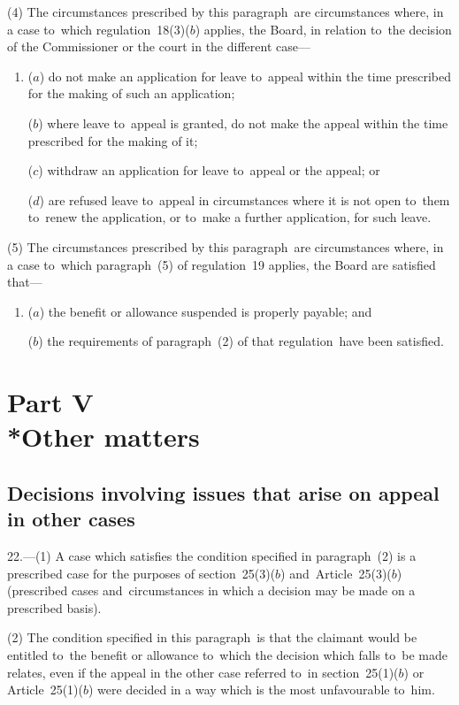 \documentclass[12pt,a4paper]{article}
\begin{document}
(4) The circumstances prescribed by this paragraph~are circumstances where, in a case to~which regulation~18(3)($b$)  applies, the Board, in relation to~the decision of the Commissioner or the court in the different case—
\begin{enumerate}\item[]
($a$) do not make an application for leave to~appeal within the time prescribed for the making of such an application;

($b$) where leave to~appeal is granted, do not make the appeal within the time prescribed for the making of it;

($c$) withdraw an application for leave to~appeal or the appeal; or

($d$) are refused leave to~appeal in circumstances where it is not open to~them to~renew the application, or to~make a further application, for such leave.
\end{enumerate}

(5) The circumstances prescribed by this paragraph~are circumstances where, in a case to~which paragraph~(5) of regulation~19 applies, the Board are satisfied that—
\begin{enumerate}\item[]
($a$) the benefit or allowance suspended is properly payable; and

($b$) the requirements of paragraph~(2) of that regulation~have been satisfied.
\end{enumerate}

\section[Part V --- Other matters]{Part V\\*Other matters}

\renewcommand\parthead{--- Part V}

\subsection[22. Decisions involving issues that arise on appeal in other cases]{Decisions involving issues that arise on appeal in other cases}

22.---(1)  A case which satisfies the condition specified in paragraph~(2) is a prescribed case for the purposes of section~25(3)($b$)  and~Article~25(3)($b$)  (prescribed cases and~circumstances in which a decision may be made on a prescribed basis).

(2) The condition specified in this paragraph~is that the claimant would be entitled to~the benefit or allowance to~which the decision which falls to~be made relates, even if the appeal in the other case referred to~in section~25(1)($b$)  or Article~25(1)($b$)  were decided in a way which is the most unfavourable to~him.
\end{document}

